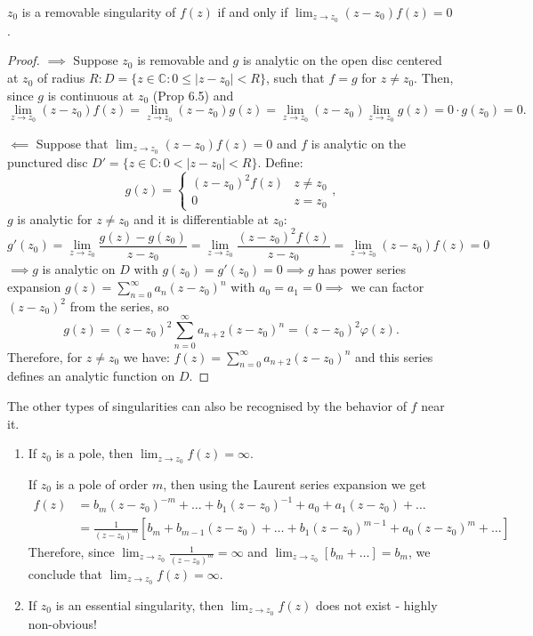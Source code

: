 \begin{proposition}\label{proposition:16.1}
    $z_0$ is a removable singularity of $f(z)$ if and only if $\lim_{z \to z_0} (z - z_0)f(z) = 0$.
\end{proposition}
\begin{proof}
 $\implies$ Suppose $z_0$ is removable and $g$ is analytic on the open disc centered at $z_0$ of radius $R: D = \{z \in \mathbb{C}: 0 \leq |z - z_0| < R\}$, such that $f = g$ for $z \neq z_0$. 
Then, since $g$ is continuous at $z_0$ (Prop 6.5) and \[ \lim_{z \to z_0} (z - z_0)f(z) = \lim_{z \to z_0} (z - z_0)g(z) = \lim_{z \to z_0} (z - z_0) \lim_{z \to z_0} g(z) = 0 \cdot g(z_0) = 0.\]

$\impliedby$ Suppose that $\lim_{z \to z_0} (z - z_0)f(z) = 0$ and $f$ is analytic on the punctured disc $D' = \{z \in \mathbb{C}: 0 < |z - z_0| < R \}$. Define:
\[ g(z) = \begin{cases}
(z - z_0)^2 f(z) & z \neq z_0 \\
0 & z = z_0
\end{cases}, \]
$g$ is analytic for $ z \neq z_0$ and it is differentiable at  $z_0$:
\[ g'(z_0) = \lim_{z \to z_0} \frac{g(z) - g(z_0)}{z - z_0} = \lim_{z \to z_0} \frac{(z - z_0)^2 f(z)}{z - z_0} = \lim_{z \to z_0} (z - z_0)f(z) = 0 \]
$\implies g$ is analytic on $D$ with $g(z_0) = g'(z_0) = 0 \implies g$ has power series expansion $g(z) = \sum_{n=0}^{\infty} a_n (z - z_0)^n$ with $a_0 = a_1 = 0 \implies$ we can factor $(z - z_0)^2$ 
from the series, so
\[ g(z) = (z - z_0)^2 \sum_{n=0}^{\infty} a_{n+2} (z - z_0)^n = (z - z_0)^2 \varphi(z).\] 
Therefore, for $z \neq z_0$ we have: $f(z) = \sum_{n=0}^{\infty} a_{n+2} (z - z_0)^n$ and this series defines an analytic function on $D$.
\end{proof}

The other types of singularities can also be recognised by the behavior of $f$ near it.
    \begin{enumerate}
        \item If $z_0$ is a pole, then $\lim_{z \to z_0} f(z) = \infty$.

If $z_0$ is a pole of order $m$, then using the Laurent series expansion we get
\begin{align*}
    f(z) &= b_m (z - z_0)^{-m} + \dots + b_1 (z - z_0)^{-1} + a_0 + a_1(z - z_0) + \dots \\ 
    & = \frac{1}{(z - z_0)^m} [b_m + b_{m-1}(z - z_0) + \dots + b_1(z - z_0)^{m-1} + a_0(z - z_0)^m + \dots] 
\end{align*}
Therefore, since $\lim_{z \to z_0} \frac{1}{(z - z_0)^m} = \infty$ and $\lim_{z \to z_0} [b_m + \dots] = b_m$, we conclude that $\lim_{z \to z_0} f(z) = \infty$.

        \item If $z_0$ is an essential singularity, then $\lim_{z \to z_0} f(z)$ does not exist - highly non-obvious!
    \end{enumerate}

